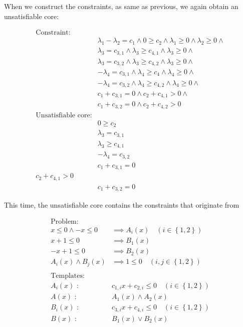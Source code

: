 When we construct the constraints, as same as previous, we again
obtain an unsatisfiable core:

\begin{align*}
\text{Constraint:} \\
& \lambda_1 - \lambda_2 = c_1 \wedge 0 \geq c_2 \wedge \lambda_1 \geq 0 \wedge \lambda_2 \geq 0 \wedge \\
& \lambda_3 = c_{3,1} \wedge \lambda_3 \geq c_{4,1} \wedge \lambda_3 \geq 0 \wedge \\
& \lambda_3 = c_{3,2} \wedge \lambda_3 \geq c_{4,2} \wedge \lambda_3 \geq 0 \wedge \\
& - \lambda_4 = c_{3,1} \wedge \lambda_4 \geq c_4 \wedge \lambda_4 \geq 0 \wedge \\
& - \lambda_4 = c_{3,2} \wedge \lambda_4 \geq c_{4,2} \wedge \lambda_4 \geq 0 \wedge \\
& c_1 + c_{3,1} = 0 \wedge c_2 + c_{4,1} > 0 \wedge \\
& c_1 + c_{3,2} = 0 \wedge c_2 + c_{4,2} > 0
\\
\text{Unsatisfiable core:} \\
& 0 \geq c_2 \\
& \lambda_3 = c_{3,1} \\
& \lambda_3 \geq c_{4,1} \\
& - \lambda_4 = c_{3,2} \\
& c_1 + c_{3,1} = 0 \\ c_2 + c_{4,1} > 0 \\
& c_1 + c_{3,2} = 0
\end{align*}

This time, the unsatisfiable core contains the constraints that
originate from


\begin{align*}
\text{Problem:} \\
x \leq 0 \wedge -x \leq 0 & \implies A_i(x) \quad (i \in \left\lbrace 1,2 \right\rbrace ) \\
x+1 \leq 0 & \implies B_1(x) \\
-x+1 \leq 0 & \implies B_2(x) \\
A_i(x) \wedge B_j(x) & \implies 1 \leq 0 \quad (i,j \in \left\lbrace 1,2 \right\rbrace ) \\
\\
\text{Templates:} \\
A_i(x) \text{ : } & c_{1,i} x + c_{2,i} \leq 0 \quad (i \in \left\lbrace 1,2 \right\rbrace ) \\
A(x) \text{ : } & A_1(x) \wedge A_2(x) \\
B_i(x) \text{ : } & c_{3,i} x + c_{4,i} \leq 0 \quad (i \in \left\lbrace 1,2 \right\rbrace ) \\
B(x) \text{ : } & B_1(x) \vee B_2(x)
\end{align*}


